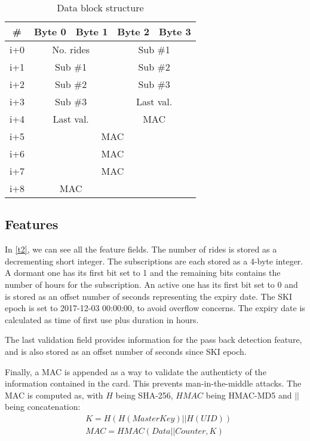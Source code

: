 \documentclass[paper=a4, fontsize=11pt]{scrartcl}
\begin{document}
\begin{table}[h!]
    \centering
    \begin{tabular}{|c|c|c|c|c|}
        \hline
        \# & Byte 0 & Byte 1 & Byte 2 & Byte 3 \\
        \hline
        i+0 & \multicolumn{2}{|c|}{No. rides} & \multicolumn{2}{|c|}{Sub \#1} \\
        \hline
        i+1 & \multicolumn{2}{|c|}{Sub \#1} & \multicolumn{2}{|c|}{Sub \#2} \\
        \hline
        i+2 & \multicolumn{2}{|c|}{Sub \#2} & \multicolumn{2}{|c|}{Sub \#3} \\
        \hline
        i+3 & \multicolumn{2}{|c|}{Sub \#3} & \multicolumn{2}{|c|}{Last val.} \\
        \hline
        i+4 & \multicolumn{2}{|c|}{Last val.} & \multicolumn{2}{|c|}{MAC} \\
        \hline
        i+5 & \multicolumn{4}{|c|}{MAC} \\
        \hline
        i+6 & \multicolumn{4}{|c|}{MAC} \\
        \hline
        i+7 & \multicolumn{4}{|c|}{MAC} \\
        \hline
        i+8 & \multicolumn{2}{|c|}{MAC} & & \\
        \hline
    \end{tabular}
    \caption{Data block structure}
    \label{t2}
\end{table}

\subsection{Features}

In \autoref{t2}, we can see all the feature fields.
The number of rides is stored as a decrementing short integer.
The subscriptions are each stored as a 4-byte integer.
A dormant one has its first bit set to 1 and the remaining bits contains the
number of hours for the subscription.
An active one has its first bit set to 0 and is stored as an offset number of
seconds representing the expiry date. The SKI epoch is set to 2017-12-03
00:00:00, to avoid overflow concerns.
The expiry date is calculated as time of first use plus duration in hours.

The last validation field provides information for the pass back detection
feature, and is also stored as an offset number of seconds since SKI epoch.

Finally, a MAC is appended as a way to validate the authenticty of the
information contained in the card.
This prevents man-in-the-middle attacks.
The MAC is computed as, with $H$ being SHA-256, $HMAC$ being HMAC-MD5 and $||$
being concatenation:
\begin{align*}
    & K = H(H(MasterKey) || H(UID)) \\
    & MAC = HMAC(Data || Counter, K)
\end{align*}
\end{document}

